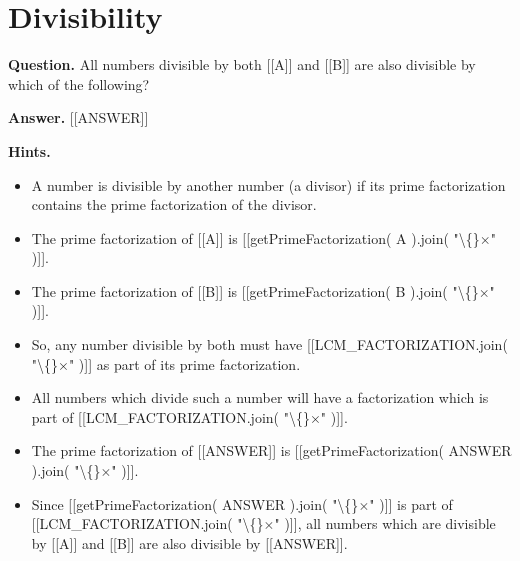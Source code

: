 \documentclass{article}
\begin{document}
\section*{Divisibility}
\textbf{Question.} All numbers divisible by both [[A]] and [[B]] are also divisible by which of the following?

\textbf{Answer.} [[ANSWER]]

\textbf{Hints.}
\begin{itemize}
  \item A number is divisible by another number (a divisor) if its prime factorization contains the prime factorization of the divisor.
  \item The prime factorization of [[A]] is [[getPrimeFactorization( A ).join( "\textbackslash\{\}$\times$" )]].
  \item The prime factorization of [[B]] is [[getPrimeFactorization( B ).join( "\textbackslash\{\}$\times$" )]].
  \item So, any number divisible by both must have [[LCM\_FACTORIZATION.join( "\textbackslash\{\}$\times$" )]] as part of its prime factorization.
  \item All numbers which divide such a number will have a factorization which is part of [[LCM\_FACTORIZATION.join( "\textbackslash\{\}$\times$" )]].
  \item The prime factorization of [[ANSWER]] is [[getPrimeFactorization( ANSWER ).join( "\textbackslash\{\}$\times$" )]].
  \item Since [[getPrimeFactorization( ANSWER ).join( "\textbackslash\{\}$\times$" )]] is part of [[LCM\_FACTORIZATION.join( "\textbackslash\{\}$\times$" )]], all numbers which are divisible by [[A]] and [[B]] are also divisible by [[ANSWER]].
\end{itemize}
\end{document}
